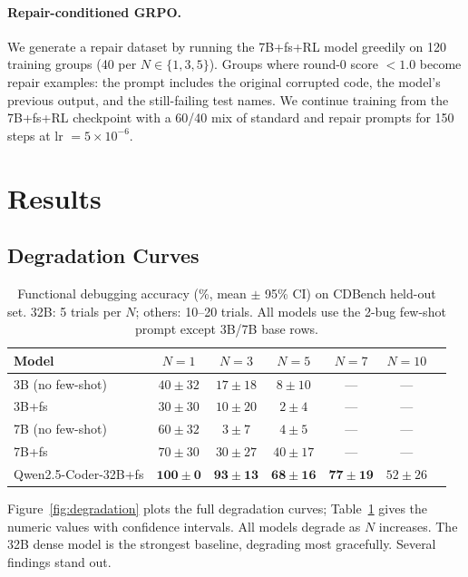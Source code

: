 \documentclass[12pt]{article}
\begin{document}
\paragraph{Repair-conditioned GRPO.}
We generate a repair dataset by running the 7B+fs+RL model greedily on 120
training groups (40 per $N \in \{1,3,5\}$). Groups where round-0 score $< 1.0$
become repair examples: the prompt includes the original corrupted code, the
model's previous output, and the still-failing test names. We continue training
from the 7B+fs+RL checkpoint with a 60/40 mix of standard and repair prompts
for 150 steps at lr $= 5{\times}10^{-6}$.

\section{Results}
\label{sec:results}

\subsection{Degradation Curves}

\begin{table}[h]
\centering
\caption{Functional debugging accuracy (\%, mean $\pm$ 95\% CI) on
  CDBench held-out set. 32B: 5 trials per $N$; others: 10--20 trials.
  All models use the 2-bug few-shot prompt except 3B/7B base rows.}
\label{tab:baselines}
\begin{tabular}{lcccccc}
\toprule
Model & $N{=}1$ & $N{=}3$ & $N{=}5$ & $N{=}7$ & $N{=}10$ \\
\midrule
3B (no few-shot)          & $40{\pm}32$ & $17{\pm}18$ & $8{\pm}10$  & ---         & ---         \\
3B+fs                     & $30{\pm}30$ & $10{\pm}20$ & $2{\pm}4$   & ---         & ---         \\
7B (no few-shot)          & $60{\pm}32$ & $3{\pm}7$   & $4{\pm}5$   & ---         & ---         \\
7B+fs                     & $70{\pm}30$ & $30{\pm}27$ & $40{\pm}17$ & ---         & ---         \\
\midrule
Qwen2.5-Coder-32B+fs      & $\mathbf{100{\pm}0}$ & $\mathbf{93{\pm}13}$ & $\mathbf{68{\pm}16}$ & $\mathbf{77{\pm}19}$ & $52{\pm}26$ \\
\bottomrule
\end{tabular}
\end{table}

Figure~\ref{fig:degradation} plots the full degradation curves;
Table~\ref{tab:baselines} gives the numeric values with confidence intervals.
All models degrade as $N$ increases. The 32B dense model is the strongest
baseline, degrading most gracefully. Several findings stand out.
\end{document}
